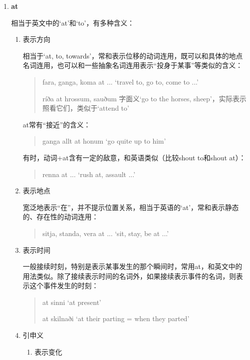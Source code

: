 \begin{enumerate}[itemindent=1em, label=\textbf{\arabic*}.]
    \item \textbf{at}

          相当于英文中的`at'和`to'，有多种含义：
          \begin{enumerate}
              \item 表示方向

                    相当于`at, to, towards'，常和表示位移的动词连用，既可以和具体的地点名词连用，也可以和一些抽象名词连用表示“投身于某事”等类似的含义：
                    \begin{quote}
                        fara, ganga, koma at ... `travel to, go to, come to ...'

                        ríða at hrossum, sauðum 字面义`go to the horses, sheep'，实际表示照看它们，类似于`attend to'
                    \end{quote}
                    at常有“接近”的含义：
                    \begin{quote}
                        ganga allt at honum `go quite up to him'
                    \end{quote}
                    有时，动词+at含有一定的敌意，和英语类似（比较shout to和shout at）：
                    \begin{quote}
                        renna at ... `rush at, assault ...'
                    \end{quote}

              \item 表示地点

                    宽泛地表示“在”，并不提示位置关系，相当于英语的`at'，常和表示静态的、存在性的动词连用：
                    \begin{quote}
                        sitja, standa, vera at ... `sit, stay, be at ...'
                    \end{quote}

              \item 表示时间

                    一般接续时刻，特别是表示某事发生的那个瞬间时，常用at，和英文中的用法类似。除了接续表示时间的名词外，如果接续表示事件的名词，则表示这个事件发生的时刻：
                    \begin{quote}
                        at sinni `at present'

                        at skilnaði `at their parting = when they parted'
                    \end{quote}

              \item 引申义
                    \begin{enumerate}
                        \item 表示变化


\end{enumerate}
\end{enumerate}
\end{enumerate}
